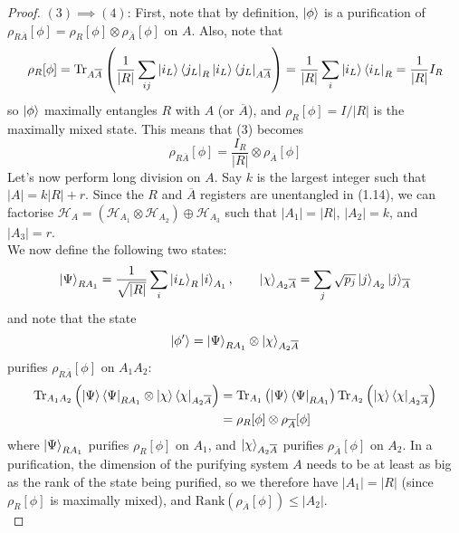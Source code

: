 \documentclass[12pt,a4paper]{article}
\numberwithin{equation}{section}
\newcommand{\ketbra}[2]{\ket{#1}\bra{#2}}
\newcommand{\ketbras}[1]{\ketbra{#1}{#1}}
\theoremstyle{definition}
\theoremstyle{theorem}
\theoremstyle{example}
\begin{document}
\begin{itemize}
\begin{proof}
				$(3)\implies (4)$: First, note that by definition, $\ket{\phi}$ is a purification of $\rho_{R\overline{A}}[\phi]=\rho_{R}[\phi]\otimes\rho_{\overline{A}}[\phi]$ on $A$. Also, note that
				\begin{equation}
					\rho_{R}[\phi]=\text{Tr}_{A\overline{A}}\left(\frac{1}{|R|}\sum_{ij}\ketbra{i_{L}}{j_{L}}_{R}\ketbra{i_{L}}{j_{L}}_{A\overline{A}}\right)=\frac{1}{|R|}\sum_{i}\ketbras{i_{L}}_{R}=\frac{1}{|R|}I_{R}
				\end{equation}
				so $\ket{\phi}$ maximally entangles $R$ with $A$ (or $\overline{A}$), and $\rho_{R}[\phi]=I/|R|$ is the maximally mixed state. This means that (3) becomes
				\begin{equation}
					\rho_{R\overline{A}}[\phi]=\frac{I_{R}}{|R|}\otimes\rho_{\overline{A}}[\phi]
				\end{equation}
				Let's now perform long division on $A$. Say $k$ is the largest integer such that $|A|=k|R|+r$. Since the $R$ and $\overline{A}$ registers are unentangled in (1.14), we can factorise $\mathcal{H}_{A}=\left(\mathcal{H}_{A_{1}}\otimes\mathcal{H}_{A_{2}}\right)\oplus\mathcal{H}_{A_{3}}$ such that $|A_{1}|=|R|$, $|A_{2}|=k$, and $|A_{3}|=r$.\\
				We now define the following two states:
				\begin{equation}
					\ket{\Psi}_{RA_{1}}=\frac{1}{\sqrt{|R|}}\sum_{i}\ket{i_{L}}_{R}\ket{i}_{A_{1}},\qquad\ket{\chi}_{A_{2}\overline{A}}=\sum_{j}\sqrt{p_{j}}\ket{j}_{A_{2}}\ket{j}_{\overline{A}}
				\end{equation}
				and note that the state
				\begin{equation}
					\ket{\phi'}=\ket{\Psi}_{RA_{1}}\otimes\ket{\chi}_{A_{2}\overline{A}}
				\end{equation}
				purifies $\rho_{R\overline{A}}[\phi]$ on $A_{1}A_{2}$:
				\begin{equation}
					\begin{aligned}
						\text{Tr}_{A_{1}A_{2}}\left(\ketbras{\Psi}_{RA_{1}}\otimes\ketbras{\chi}_{A_{2}\overline{A}}\right)&=\text{Tr}_{A_{1}}\left(\ketbras{\Psi}_{RA_{1}}\right)\text{Tr}_{A_{2}}\left(\ketbras{\chi}_{A_{2}\overline{A}}\right)\\&=\rho_{R}[\phi]\otimes\rho_{\overline{A}}[\phi]
					\end{aligned}
				\end{equation}
				where $\ket{\Psi}_{RA_{1}}$ purifies $\rho_{R}[\phi]$ on $A_{1}$, and $\ket{\chi}_{A_{2}\overline{A}}$ purifies $\rho_{\overline{A}}[\phi]$ on $A_{2}$. In a purification, the dimension of the purifying system $A$ needs to be at least as big as the rank of the state being purified, so we therefore have $|A_{1}|=|R|$ (since $\rho_{R}[\phi]$ is maximally mixed), and $\text{Rank}\left(\rho_{\overline{A}}[\phi]\right)\leq|A_{2}|$.\\

\end{proof}
\end{itemize}
\end{document}
